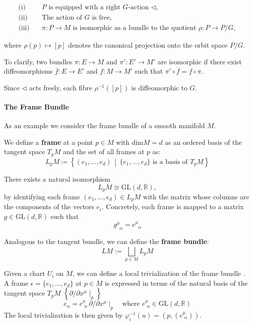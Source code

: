 \begin{align*}
  \text{(i)}\quad & P \text{ is equipped with a right } G\text{-action } \triangleleft, \\
  \text{(ii)}\quad & \text{The action of } G \text{ is free}, \\
  \text{(iii)}\quad & \pi : P \to M \text{ is isomorphic as a bundle to the quotient } \rho : P \to P/G,
\end{align*}

where \( \rho(p) \mapsto [p] \) denotes the canonical projection onto the orbit space \( P/G \). 

To clarify, two bundles \( \pi: E \to M \) and \( \pi': E' \to M' \) are isomorphic if there exist diffeomorphisms \( \bar{f}: E \to E' \) and \( f: M \to M' \) such that \( \pi' \circ \bar{f} = f \circ \pi \).

Since \( \triangleleft \) acts freely, each fibre \( \rho^{-1}([p]) \) is diffeomorphic to \(G\).


\paragraph{The Frame Bundle}

As an example we consider the frame bundle of a smooth manifold \( M \).

We define a \textbf{frame} at a point \(p\in M\) with \(\text{dim} M = d\) as an ordered basis of the tangent space \(T_pM\) and the set  of all frames at \(p\) as:
\[
L_pM \coloneqq \left\{ (e_1, \dots, e_d) \,\middle|\, \{e_1, \dots, e_d\} \text{ is a basis of } T_pM \right\}
\]

There exists a natural isomorphism
\[
L_pM \cong \mathrm{GL}(d, \mathbb{R}),
\]
by identifying each frame \( (e_1, \dots, e_d) \in L_pM \) with the matrix whose columns are the components of the vectors \( e_i \). Concretely, each frame is mapped to a matrix \( g \in \mathrm{GL}(d, \mathbb{R}) \) such that
\[
g^\mu_{\;\;\alpha} = e^\mu_{\;\;\alpha}
\]



Analogous to the tangent bundle, we can define the \textbf{frame bundle}:
\[ LM := \bigsqcup_{p \in M} L_pM \]

Given a chart \(U_i\) on \( M \), we can define a local trivialization of the frame bundle \cite{NakaharaGeometrytopologyphysics2005}. A frame $\epsilon = \{e_1, \dots, e_d\}$ at $p\in M$ is expressed in terms of the natural basis of the tangent space \(T_pM\) \( \left\{ \partial / \partial x^\mu \mid_p \right\} \)
\[ e_\alpha = e^\mu_{\,\,\alpha} \, \partial/\partial x^\mu \mid_p \quad \text{where }e^\mu_{\,\,\alpha} \in \mathrm{GL}(d, \mathbb{R}) \]
The local trivialization is then given by \( \varphi_i^{-1}(u)=(p,(e^\mu_{\,\,\alpha}))\).

